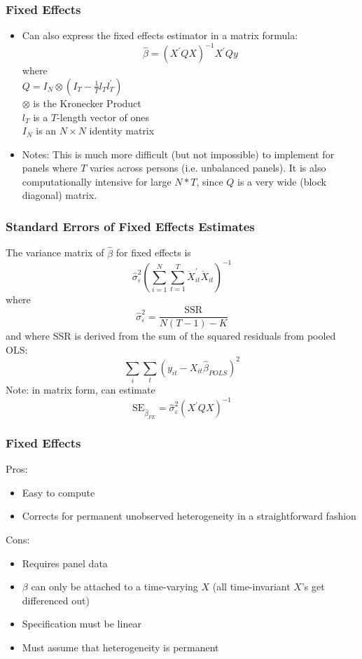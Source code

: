 \documentclass[english,xcolor=dvipsnames]{beamer}
\newcommand{\bi}{\begin{itemize}}
\newcommand{\ei}{\end{itemize}}
\begin{document}
\begin{frame}
\frametitle{Fixed Effects}
   \bi 
   \item Can also express the fixed effects estimator in a matrix formula: \[
   			 \hat{\beta} = \left(X^{\prime}QX\right)^{-1}X^{\prime} Q y\] where\\ $Q = I_{N}\otimes\left(I_{T}-\frac{1}{T}l_{T}l_{T}^{\prime}\right)$\\ $\otimes$ is the Kronecker Product\\ $l_{T}$ is a $T$-length vector of ones\\ $I_{N}$ is an $N \times N$ identity matrix\\
   \item Notes: This is much more difficult (but not impossible) to implement for panels where $T$ varies across persons (i.e. unbalanced panels). It is also computationally intensive for large $N\ast T$, since $Q$ is a very wide (block diagonal) matrix.
   \ei
\end{frame}

\begin{frame}
\frametitle{Standard Errors of Fixed Effects Estimates}
The variance matrix of $\hat{\beta}$ for fixed effects is 
\[
\hat{\sigma}^{2}_{\varepsilon}\left(\sum_{i=1}^{N}\sum_{t=1}^{T}\ddot{X}_{it}^{\prime}\ddot{X}_{it}\right)^{-1}
\]
where
\[
\hat{\sigma}^{2}_{\varepsilon} = \frac{\textrm{SSR}}{N(T-1)-K}
\]
and where SSR is derived from the sum of the squared residuals from pooled OLS:
\[
\sum_{i}\sum_{t} \left(y_{it}-X_{it}\hat{\beta}_{POLS}\right)^{2}
\]
Note: in matrix form, can estimate \[\textrm{SE}_{\hat{\beta}_{FE}}=\hat{\sigma}^{2}_{\varepsilon}\left(X^{\prime}QX\right)^{-1}\]
\end{frame}

\begin{frame}   
\frametitle{Fixed Effects}
Pros:
      \bi 
      \item Easy to compute
      \item Corrects for permanent unobserved heterogeneity in a straightforward fashion
      \ei
Cons:
      \bi 
      \item Requires panel data
      \item $\beta$ can only be attached to a time-varying $X$ (all time-invariant $X$'s get differenced out)
      \item Specification must be linear
      \item Must assume that heterogeneity is permanent
      \ei
\end{frame}
\end{document}
